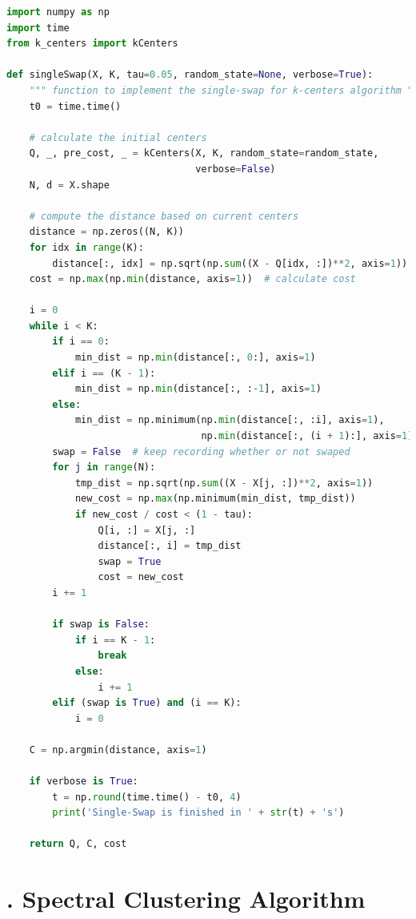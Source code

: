 \begin{lstlisting}[language=Python, caption=Single-Swap Algorithm Python Code]
import numpy as np
import time
from k_centers import kCenters

def singleSwap(X, K, tau=0.05, random_state=None, verbose=True):
    """ function to implement the single-swap for k-centers algorithm """
    t0 = time.time()

    # calculate the initial centers
    Q, _, pre_cost, _ = kCenters(X, K, random_state=random_state,
                                 verbose=False)
    N, d = X.shape

    # compute the distance based on current centers
    distance = np.zeros((N, K))
    for idx in range(K):
        distance[:, idx] = np.sqrt(np.sum((X - Q[idx, :])**2, axis=1))
    cost = np.max(np.min(distance, axis=1))  # calculate cost

    i = 0
    while i < K:
        if i == 0:
            min_dist = np.min(distance[:, 0:], axis=1)
        elif i == (K - 1):
            min_dist = np.min(distance[:, :-1], axis=1)
        else:
            min_dist = np.minimum(np.min(distance[:, :i], axis=1),
                                  np.min(distance[:, (i + 1):], axis=1))
        swap = False  # keep recording whether or not swaped
        for j in range(N):
            tmp_dist = np.sqrt(np.sum((X - X[j, :])**2, axis=1))
            new_cost = np.max(np.minimum(min_dist, tmp_dist))
            if new_cost / cost < (1 - tau):
                Q[i, :] = X[j, :]
                distance[:, i] = tmp_dist
                swap = True
                cost = new_cost
        i += 1

        if swap is False:
            if i == K - 1:
                break
            else:
                i += 1
        elif (swap is True) and (i == K):
            i = 0

    C = np.argmin(distance, axis=1)

    if verbose is True:
        t = np.round(time.time() - t0, 4)
        print('Single-Swap is finished in ' + str(t) + 's')

    return Q, C, cost
\end{lstlisting}

\section*{\Large {}. Spectral Clustering Algorithm}

